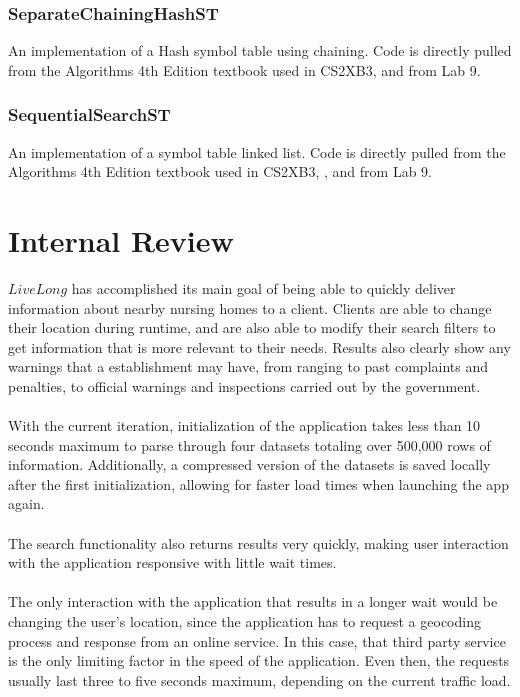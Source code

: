 \documentclass[12pt]{article}
\begin{document}
\subsubsection{SeparateChainingHashST}
An implementation of a Hash symbol table using chaining. Code is directly pulled from the Algorithms 4th Edition textbook used in CS2XB3, and from Lab 9.

\subsubsection{SequentialSearchST}
An implementation of a symbol table linked list. Code is directly pulled from the Algorithms 4th Edition textbook used in CS2XB3, , and from Lab 9.



\newpage
\section{Internal Review}
$LiveLong$ has accomplished its main goal of being able to quickly deliver information about nearby nursing homes to a client. Clients are able to change their location during runtime, and are also able to modify their search filters to get information that is more relevant to their needs. Results also clearly show any warnings that a establishment may have, from ranging to past complaints and penalties, to official warnings and inspections carried out by the government.
\\ \\
With the current iteration, initialization of the application takes less than 10 seconds maximum to parse through four datasets totaling over 500,000 rows of information. Additionally, a compressed version of the datasets is saved locally after the first initialization, allowing for faster load times when launching the app again.
\\ \\
The search functionality also returns results very quickly, making user interaction with the application responsive with little wait times.
\\ \\
The only interaction with the application that results in a longer wait would be changing the user's location, since the application has to request a geocoding process and response from an online service. In this case, that third party service is the only limiting factor in the speed of the application. Even then, the requests usually last three to five seconds maximum, depending on the current traffic load.
\end{document}
